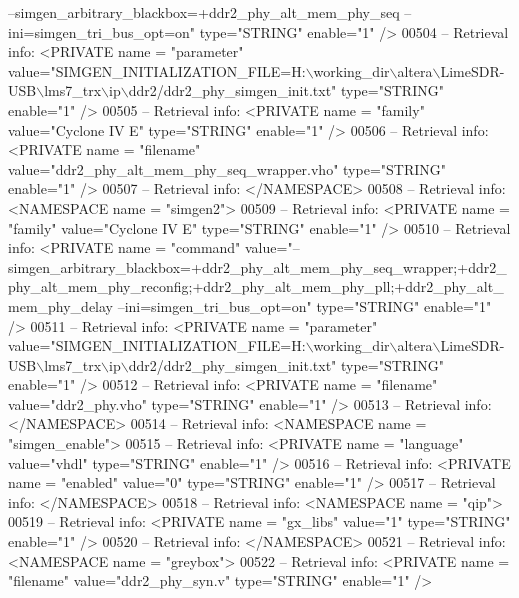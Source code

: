 \begin{DoxyCode}
{{       --simgen\_arbitrary\_blackbox=+ddr2\_phy\_alt\_mem\_phy\_seq --ini=simgen\_tri\_bus\_opt=on"  type="STRING"  enable="1" />}
00504 \textcolor{keyword}{-- Retrieval info:      <PRIVATE name = "parameter"
       value="SIMGEN\_INITIALIZATION\_FILE=H:\(\backslash\)working\_dir\(\backslash\)altera\(\backslash\)LimeSDR-USB\(\backslash\)lms7\_trx\(\backslash\)ip\(\backslash\)ddr2/ddr2\_phy\_simgen\_init.txt"  type="STRING"  enable="1" />}
00505 \textcolor{keyword}{-- Retrieval info:      <PRIVATE name = "family" value="Cyclone IV E"  type="STRING"  enable="1" />}
00506 \textcolor{keyword}{-- Retrieval info:      <PRIVATE name = "filename" value="ddr2\_phy\_alt\_mem\_phy\_seq\_wrapper.vho" 
       type="STRING"  enable="1" />}
00507 \textcolor{keyword}{-- Retrieval info:     </NAMESPACE>}
00508 \textcolor{keyword}{-- Retrieval info:     <NAMESPACE name = "simgen2">}
00509 \textcolor{keyword}{-- Retrieval info:      <PRIVATE name = "family" value="Cyclone IV E"  type="STRING"  enable="1" />}
00510 \textcolor{keyword}{-- Retrieval info:      <PRIVATE name = "command"
       value="--simgen\_arbitrary\_blackbox=+ddr2\_phy\_alt\_mem\_phy\_seq\_wrapper;+ddr2\_phy\_alt\_mem\_phy\_reconfig;+ddr2\_phy\_alt\_mem\_phy\_pll;+ddr2\_phy\_alt\_mem\_phy\_delay
       --ini=simgen\_tri\_bus\_opt=on"  type="STRING"  enable="1" />}
00511 \textcolor{keyword}{-- Retrieval info:      <PRIVATE name = "parameter"
       value="SIMGEN\_INITIALIZATION\_FILE=H:\(\backslash\)working\_dir\(\backslash\)altera\(\backslash\)LimeSDR-USB\(\backslash\)lms7\_trx\(\backslash\)ip\(\backslash\)ddr2/ddr2\_phy\_simgen\_init.txt"  type="STRING"  enable="1" />}
00512 \textcolor{keyword}{-- Retrieval info:      <PRIVATE name = "filename" value="ddr2\_phy.vho"  type="STRING"  enable="1" />}
00513 \textcolor{keyword}{-- Retrieval info:     </NAMESPACE>}
00514 \textcolor{keyword}{-- Retrieval info:     <NAMESPACE name = "simgen\_enable">}
00515 \textcolor{keyword}{-- Retrieval info:      <PRIVATE name = "language" value="vhdl"  type="STRING"  enable="1" />}
00516 \textcolor{keyword}{-- Retrieval info:      <PRIVATE name = "enabled" value="0"  type="STRING"  enable="1" />}
00517 \textcolor{keyword}{-- Retrieval info:     </NAMESPACE>}
00518 \textcolor{keyword}{-- Retrieval info:     <NAMESPACE name = "qip">}
00519 \textcolor{keyword}{-- Retrieval info:      <PRIVATE name = "gx\_libs" value="1"  type="STRING"  enable="1" />}
00520 \textcolor{keyword}{-- Retrieval info:     </NAMESPACE>}
00521 \textcolor{keyword}{-- Retrieval info:     <NAMESPACE name = "greybox">}
00522 \textcolor{keyword}{-- Retrieval info:      <PRIVATE name = "filename" value="ddr2\_phy\_syn.v"  type="STRING"  enable="1" />}
}
\end{DoxyCode}
